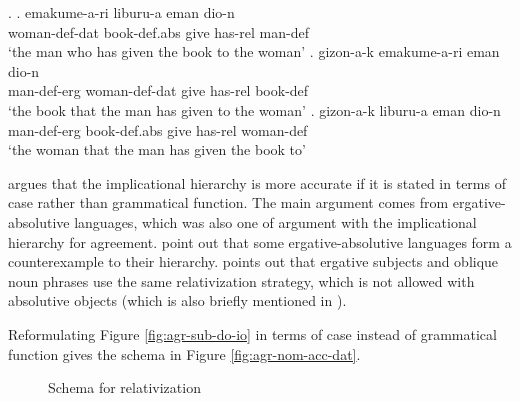 \ex.\label{ex:basque-rel}
\ag. emakume-a-ri liburu-a eman dio-n \\
 woman-\ac{def}-\ac{dat} book-\ac{def}.\ac{abs} give has-\ac{rel} man-\ac{def}\\
 `the man who has given the book to the woman'\label{ex:basque-sub}
\bg. gizon-a-k emakume-a-ri eman dio-n \\
 man-\ac{def}-\ac{erg} woman-\ac{def}-\ac{dat} give has-\ac{rel} book-\ac{def}\\
 `the book that the man has given to the woman'\label{ex:basque-do}
\bg. gizon-a-k liburu-a eman dio-n \\
 man-\ac{def}-\ac{erg} book-\ac{def}.\ac{abs} give has-\ac{rel} woman-\ac{def}\\
 `the woman that the man has given the book to' \label{ex:basque-io}

\citet{caha2009} argues that the implicational hierarchy is more accurate if it is stated in terms of case rather than grammatical function. The main argument comes from ergative-absolutive languages, which was also one of  argument with the implicational hierarchy for agreement. \citet{keenan1977} point out that some ergative-absolutive languages form a counterexample to their hierarchy. \citet{caha2009} points out that ergative subjects and oblique noun phrases use the same relativization strategy, which is not allowed with absolutive objects (which is also briefly mentioned in
\citealt{bobaljik2006}).

Reformulating Figure \ref{fig:agr-sub-do-io} in terms of case instead of grammatical function gives the schema in Figure \ref{fig:agr-nom-acc-dat}.

\begin{figure}[ht]
  \centering
  \caption{Schema for relativization}
  \label{fig:rel-def-dep-dat}
\end{figure}

